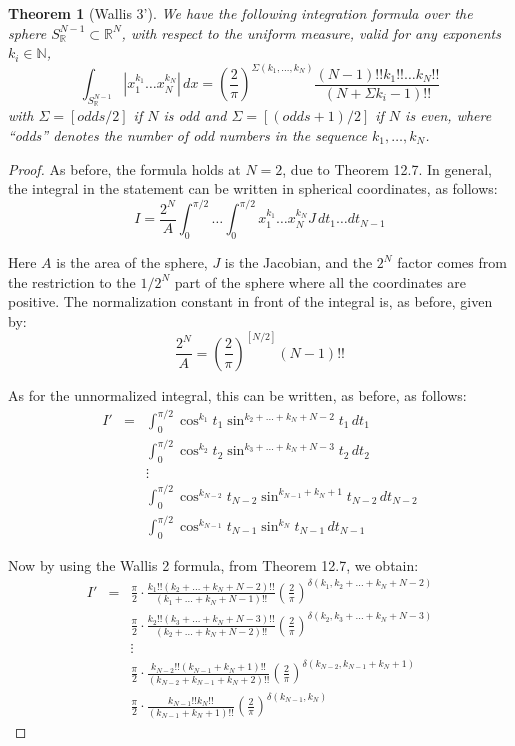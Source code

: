 \documentclass[12pt]{amsbook}
\newtheorem{theorem}{Theorem}[chapter]
\begin{document}

\begin{theorem}[Wallis 3']
We have the following integration formula over the sphere $S^{N-1}_\mathbb R\subset\mathbb R^N$, with respect to the uniform measure, valid for any exponents $k_i\in\mathbb N$,
$$\int_{S^{N-1}_\mathbb R}|x_1^{k_1}\ldots x_N^{k_N}|\,dx=\left(\frac{2}{\pi}\right)^{\Sigma(k_1,\ldots,k_N)}\frac{(N-1)!!k_1!!\ldots k_N!!}{(N+\Sigma k_i-1)!!}$$
with $\Sigma=[odds/2]$ if $N$ is odd and $\Sigma=[(odds+1)/2]$ if $N$ is even, where ``odds'' denotes the number of odd numbers in the sequence $k_1,\ldots,k_N$.
\end{theorem}

\begin{proof}
As before, the formula holds at $N=2$, due to Theorem 12.7. In general, the integral in the statement can be written in spherical coordinates, as follows:
$$I=\frac{2^N}{A}\int_0^{\pi/2}\ldots\int_0^{\pi/2}x_1^{k_1}\ldots x_N^{k_N}J\,dt_1\ldots dt_{N-1}$$

Here $A$ is the area of the sphere, $J$ is the Jacobian, and the $2^N$ factor comes from the restriction to the $1/2^N$ part of the sphere where all the coordinates are positive. The normalization constant in front of the integral is, as before, given by:
$$\frac{2^N}{A}=\left(\frac{2}{\pi}\right)^{[N/2]}(N-1)!!$$

As for the unnormalized integral, this can be written, as before, as follows:
\begin{eqnarray*}
I'
&=&\int_0^{\pi/2}\cos^{k_1}t_1\sin^{k_2+\ldots+k_N+N-2}t_1\,dt_1\\
&&\int_0^{\pi/2}\cos^{k_2}t_2\sin^{k_3+\ldots+k_N+N-3}t_2\,dt_2\\
&&\vdots\\
&&\int_0^{\pi/2}\cos^{k_{N-2}}t_{N-2}\sin^{k_{N-1}+k_N+1}t_{N-2}\,dt_{N-2}\\
&&\int_0^{\pi/2}\cos^{k_{N-1}}t_{N-1}\sin^{k_N}t_{N-1}\,dt_{N-1}
\end{eqnarray*}

Now by using the Wallis 2 formula, from Theorem 12.7, we obtain:
\begin{eqnarray*}
I'
&=&\frac{\pi}{2}\cdot\frac{k_1!!(k_2+\ldots+k_N+N-2)!!}{(k_1+\ldots+k_N+N-1)!!}\left(\frac{2}{\pi}\right)^{\delta(k_1,k_2+\ldots+k_N+N-2)}\\
&&\frac{\pi}{2}\cdot\frac{k_2!!(k_3+\ldots+k_N+N-3)!!}{(k_2+\ldots+k_N+N-2)!!}\left(\frac{2}{\pi}\right)^{\delta(k_2,k_3+\ldots+k_N+N-3)}\\
&&\vdots\\
&&\frac{\pi}{2}\cdot\frac{k_{N-2}!!(k_{N-1}+k_N+1)!!}{(k_{N-2}+k_{N-1}+k_N+2)!!}\left(\frac{2}{\pi}\right)^{\delta(k_{N-2},k_{N-1}+k_N+1)}\\
&&\frac{\pi}{2}\cdot\frac{k_{N-1}!!k_N!!}{(k_{N-1}+k_N+1)!!}\left(\frac{2}{\pi}\right)^{\delta(k_{N-1},k_N)}
\end{eqnarray*}


\end{proof}
\end{document}
